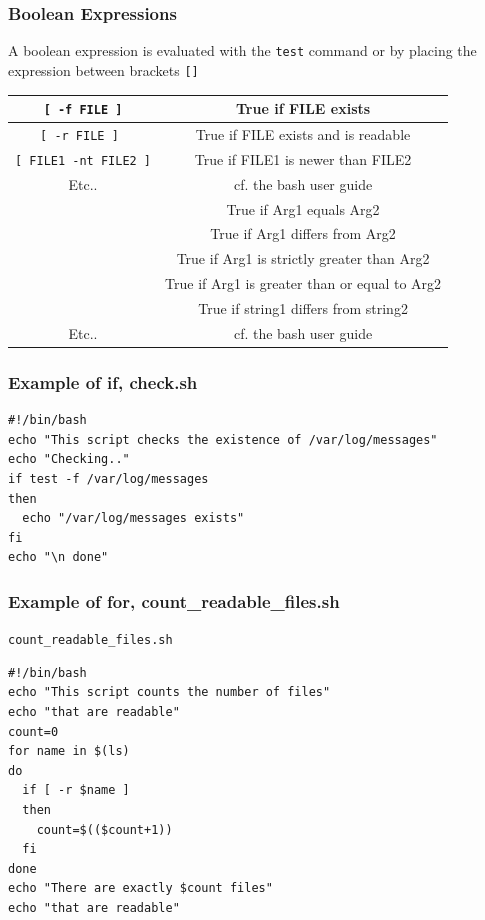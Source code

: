 \documentclass{beamer}
\begin{document}
\begin{frame}[fragile]
\frametitle{Boolean Expressions}
A boolean expression is evaluated with the \verb|test| command or by placing the expression between brackets \verb|[]|
\begin{scriptsize}
\begin{center}
\begin{tabular}{|c|c|}
\hline
\verb|[ -f FILE ]| & True if FILE exists \\
\hline
\verb|[ -r FILE ] | & True if FILE exists and is readable \\
\hline
\verb|[ FILE1 -nt FILE2 ]| & True if FILE1 is newer than FILE2 \\
\hline
Etc.. & cf. the bash user guide\\
\hline
[ Arg1 -eq Arg2 ] & True if Arg1 equals Arg2 \\
\hline
[ Arg1 -ne Arg2 ] & True if Arg1 differs from Arg2 \\
\hline
\hline
[ Arg1 -gt Arg2 ] & True if Arg1 is strictly greater than Arg2 \\
\hline
[ Arg1 -ge Arg2 ] & True if Arg1 is greater than or equal to Arg2 \\
\hline
[ string1 != string2 ] & True if string1 differs from string2 \\
\hline
Etc.. & cf. the bash user guide\\
\hline
\end{tabular}
\end{center}
\end{scriptsize}

\end{frame}


\begin{frame}[fragile]
  \frametitle{Example of if, check.sh}
  \begin{block}{}
\begin{verbatim}
#!/bin/bash
echo "This script checks the existence of /var/log/messages"
echo "Checking.."
if test -f /var/log/messages
then
  echo "/var/log/messages exists"
fi
echo "\n done"
\end{verbatim}
\end{block}
\end{frame}


\begin{frame}[fragile]
  \frametitle{Example of for, count\_readable\_files.sh}
  \begin{block}{\texttt{count\_readable\_files.sh}}
\begin{verbatim}
#!/bin/bash
echo "This script counts the number of files"
echo "that are readable"
count=0
for name in $(ls)
do
  if [ -r $name ]
  then
    count=$(($count+1))
  fi
done
echo "There are exactly $count files"
echo "that are readable"
\end{verbatim}
\end{block}
\end{frame}
\end{document}
